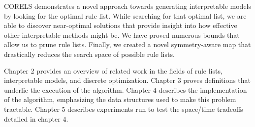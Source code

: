 CORELS demonstrates a novel approach towards generating interpretable models by looking for the optimal rule list. 
While searching for that optimal list, we are able to discover near-optimal solutions that provide insight into how effective other interpretable methods might be. 
We have proved numerous bounds that allow us to prune rule lists.
Finally, we created a novel symmetry-aware map that drastically reduces the search space of possible rule lists.

Chapter 2 provides an overview of related work in the fields of rule lists, interpretable models, and discrete optimization. 
Chapter 3 proves definitions that underlie the execution of the algorithm.
Chapter 4 describes the implementation of the algorithm, emphasizing the data structures used to make this problem tractable.
Chapter 5 describes experiments run to test the space/time tradeoffs detailed in chapter 4.